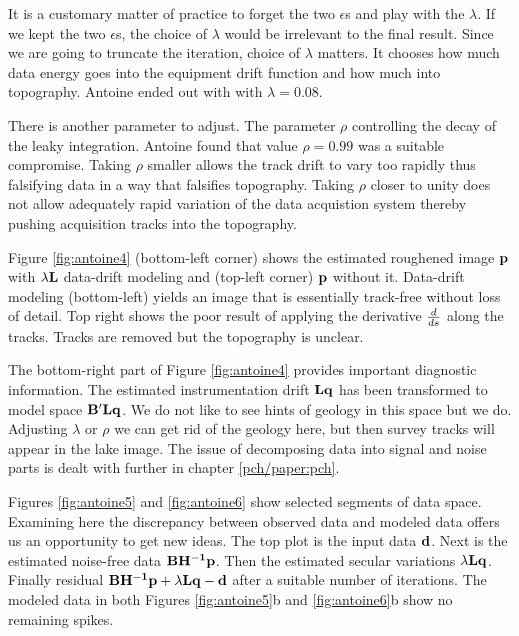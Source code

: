 \par
It is a customary matter of practice to forget the two $\epsilon$s
and play with the $\lambda$.
If we kept the two $\epsilon$s,
the choice of $\lambda$ would be irrelevant to the final result.
Since we are going to truncate the iteration,
choice of $\lambda$ matters.
It chooses how much data energy goes into the equipment drift function
and how much into topography.
Antoine ended out with with $\lambda=0.08$.

\par
There is another parameter to adjust.
The parameter $\rho$ controlling the decay of the leaky integration. 
Antoine found that value ${\rho=0.99}$ was a suitable compromise.
Taking $\rho$ smaller allows the track drift to vary too rapidly thus
falsifying data in a way that falsifies topography.
Taking $\rho$ closer to unity does not allow adequately rapid variation
of the data acquistion system
thereby pushing acquisition tracks into the topography.

\par
Figure \ref{fig:antoine4}
(bottom-left corner)
shows the estimated roughened image ${\bf p}$
with $\lambda\bold L$ data-drift modeling and
(top-left corner) ${\bf p}$ without it.
Data-drift modeling (bottom-left)
yields an image that is essentially track-free without loss of detail.
Top right shows the poor result of applying 
the derivative $d \over ds$ along the tracks.
Tracks are removed but the topography is unclear.

\par
The bottom-right part of
Figure \ref{fig:antoine4} provides important diagnostic information.
The estimated instrumentation drift $\bold L\bold q$ has been transformed
to model space $\bold B'\bold L\bold q$.
We do not like to see hints of geology in this space but we do.
Adjusting $\lambda$ or $\rho$ we can get rid of the geology here,
but then survey tracks will appear in the lake image.
The issue of decomposing data into signal and noise parts
is dealt with further in chapter \ref{pch/paper:pch}.

\par
Figures \ref{fig:antoine5} and \ref{fig:antoine6} show
selected segments of data space.
Examining here the discrepancy between observed data and modeled data
offers us an opportunity to get new ideas.
The top plot is the input data $\bold{d}$.
Next is the estimated noise-free data ${\bf BH^{-1}p}$.
Then the estimated secular variations $\lambda \bold L \bold q$.
Finally residual
$\bold B \bold {H^{-1}} \bold p + \lambda \bold L \bold q - \bold d$
after a suitable number of iterations.
The modeled data in both Figures \ref{fig:antoine5}b and 
\ref{fig:antoine6}b show no remaining spikes.


